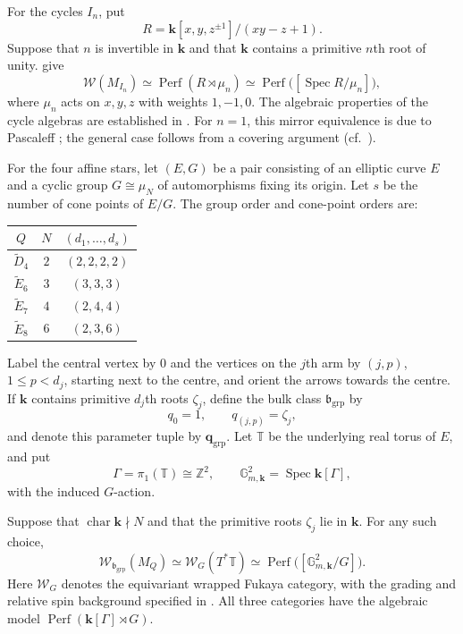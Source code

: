\documentclass[a4paper]{amsart}
\newcommand{\kk}{\mathbf{k}}
\newcommand{\ZZ}{\mathbb{Z}}
\DeclareMathOperator{\Perf}{Perf}
\numberwithin{equation}{section}
\begin{document}
\begin{remark}\label{rem:cycles}
For the cycles $I_n$, put
\[
 R=\kk[x,y,z^{\pm1}]/(xy-z+1).
\]
Suppose that $n$ is invertible in $\kk$ and that $\kk$ contains a
primitive $n$th root of unity.  give
\[
 \mathcal W(M_{I_n})\simeq\Perf(R\rtimes\mu_n)
 \simeq\Perf\bigl([\operatorname{Spec}R/\mu_n]\bigr),
\]
where $\mu_n$ acts on $x,y,z$ with weights $1,-1,0$. The algebraic
properties of the cycle algebras are established in
\cite[Theorem~1.2 and Section~6.2]{KS}. For $n=1$, this mirror
equivalence is due to Pascaleff \cite{PascaleffBinodal}; the general
case follows from a covering argument (cf.\ \cite{ChanUeda}).
\end{remark}

For the four affine stars, let $(E,G)$ be a pair consisting of an
elliptic curve $E$ and a cyclic group $G\cong\mu_N$ of automorphisms
fixing its origin. Let $s$ be the number of cone points of $E/G$.
The group order and cone-point orders are:
\begin{center}
\begin{tabular}{@{}ccc@{}}
\toprule
$Q$ & $N$ & $(d_1,\ldots,d_s)$\\
\midrule
$\widetilde D_4$ & $2$ & $(2,2,2,2)$\\
$\widetilde E_6$ & $3$ & $(3,3,3)$\\
$\widetilde E_7$ & $4$ & $(2,4,4)$\\
$\widetilde E_8$ & $6$ & $(2,3,6)$\\
\bottomrule
\end{tabular}
\end{center}
Label the central vertex by $0$ and the vertices on the $j$th arm
by $(j,p)$, $1\le p<d_j$, starting next to the centre, and orient
the arrows towards the centre. If $\kk$ contains primitive
$d_j$th roots $\zeta_j$, define the bulk class $\mathfrak b_{\mathrm{grp}}$ by
\[
 q_0=1,\qquad q_{(j,p)}=\zeta_j,
\]
and denote this parameter tuple by $\boldsymbol q_{\mathrm{grp}}$.
Let $\mathbb{T}$ be the underlying real torus of $E$, and put
\[
 \Gamma=\pi_1(\mathbb{T})\cong\ZZ^2,\qquad
 \mathbb G_{m,\kk}^2=\operatorname{Spec}\kk[\Gamma],
\]
with the induced $G$-action.

\begin{corollary}\label{cor:orbifold-mirror}
Suppose that $\operatorname{char}\kk\nmid N$ and that the primitive
roots $\zeta_j$ lie in $\kk$. For any such choice,
\[
 \mathcal W_{\mathfrak b_{\mathrm{grp}}}(M_Q)
 \simeq\mathcal W_G(T^*\mathbb{T})
 \simeq\Perf\bigl([\mathbb G_{m,\kk}^2/G]\bigr).
\]
Here $\mathcal W_G$ denotes the equivariant wrapped Fukaya category,
with the grading and relative spin background specified in
. All three categories have the algebraic model
$\Perf(\kk[\Gamma]\rtimes G)$.
\end{corollary}
\end{document}
